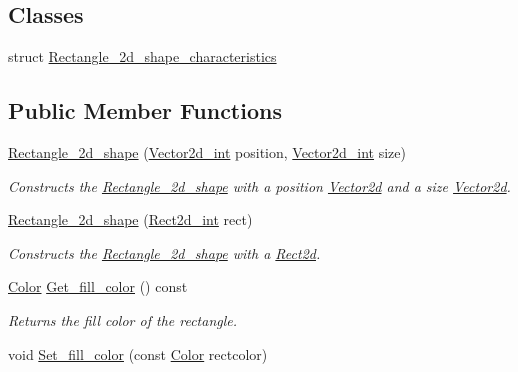 \subsection*{Classes}
\begin{DoxyCompactItemize}
\item 
struct \hyperlink{structjetfuel_1_1draw_1_1Rectangle__2d__shape_1_1Rectangle__2d__shape__characteristics}{Rectangle\+\_\+2d\+\_\+shape\+\_\+characteristics}
\end{DoxyCompactItemize}
\subsection*{Public Member Functions}
\begin{DoxyCompactItemize}
\item 
\hyperlink{classjetfuel_1_1draw_1_1Rectangle__2d__shape_a4ee9006d8e9d043092eff698ab484210}{Rectangle\+\_\+2d\+\_\+shape} (\hyperlink{classjetfuel_1_1draw_1_1Vector2d}{Vector2d\+\_\+int} position, \hyperlink{classjetfuel_1_1draw_1_1Vector2d}{Vector2d\+\_\+int} size)
\begin{DoxyCompactList}\small\item\em Constructs the \hyperlink{classjetfuel_1_1draw_1_1Rectangle__2d__shape}{Rectangle\+\_\+2d\+\_\+shape} with a position \hyperlink{classjetfuel_1_1draw_1_1Vector2d}{Vector2d} and a size \hyperlink{classjetfuel_1_1draw_1_1Vector2d}{Vector2d}. \end{DoxyCompactList}\item 
\hyperlink{classjetfuel_1_1draw_1_1Rectangle__2d__shape_a5b75e1dc1fe55ecf69b551888d78e352}{Rectangle\+\_\+2d\+\_\+shape} (\hyperlink{classjetfuel_1_1draw_1_1Rect2d}{Rect2d\+\_\+int} rect)
\begin{DoxyCompactList}\small\item\em Constructs the \hyperlink{classjetfuel_1_1draw_1_1Rectangle__2d__shape}{Rectangle\+\_\+2d\+\_\+shape} with a \hyperlink{classjetfuel_1_1draw_1_1Rect2d}{Rect2d}. \end{DoxyCompactList}\item 
\hyperlink{classjetfuel_1_1draw_1_1Color}{Color} \hyperlink{classjetfuel_1_1draw_1_1Rectangle__2d__shape_a87340a4dcdcdc3b4d3aa059b5fe4c3af}{Get\+\_\+fill\+\_\+color} () const
\begin{DoxyCompactList}\small\item\em Returns the fill color of the rectangle. \end{DoxyCompactList}\item 
void \hyperlink{classjetfuel_1_1draw_1_1Rectangle__2d__shape_a2dfd78b34c5d1742ca2e41b86c7f9d12}{Set\+\_\+fill\+\_\+color} (const \hyperlink{classjetfuel_1_1draw_1_1Color}{Color} rectcolor)

\end{DoxyCompactItemize}
